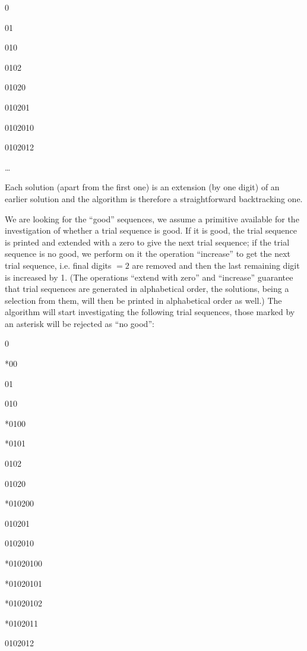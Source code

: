0

01

010

0102

01020

010201

0102010

0102012

\dots

Each solution (apart from the first one) is an extension (by one digit) of an earlier solution and the algorithm is therefore a straightforward backtracking one.

We are looking for the ``good'' sequences, we assume a primitive available for the investigation of whether a trial sequence is good. If it is good, the trial sequence is printed and extended with a zero to give the next trial sequence; if the trial sequence is no good, we perform on it the operation ``increase'' to get the next trial sequence, i.e. final digits $= 2$ are removed and then the last remaining digit is increased by 1. (The operations ``extend with zero'' and ``increase'' guarantee that trial sequences are generated in alphabetical order, the solutions, being a selection from them, will then be printed in alphabetical order as well.) The algorithm will start investigating the following trial sequences, those marked by an asterisk will be rejected as ``no good'':

\noindent
\tabto{\parindent}0

\noindent
*\tabto{\parindent}00

\noindent
\tabto{\parindent}01

\noindent
\tabto{\parindent}010

\noindent
*\tabto{\parindent}0100

\noindent
*\tabto{\parindent}0101

\noindent
\tabto{\parindent}0102

\noindent
\tabto{\parindent}01020

\noindent
*\tabto{\parindent}010200

\noindent
\tabto{\parindent}010201

\noindent
\tabto{\parindent}0102010

\noindent
*\tabto{\parindent}01020100

\noindent
*\tabto{\parindent}01020101

\noindent
*\tabto{\parindent}01020102

\noindent
*\tabto{\parindent}0102011

\noindent
\tabto{\parindent}0102012

